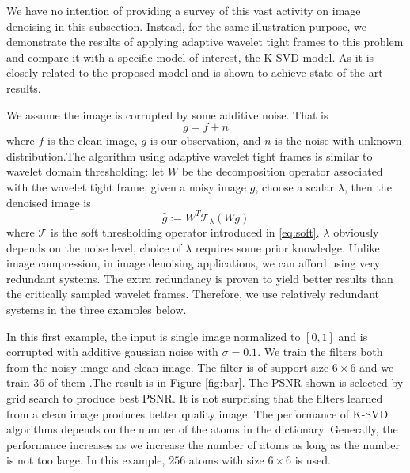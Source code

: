 \documentclass[a4paper]{article}
\begin{document}
We have no intention of providing a survey of this vast activity on image denoising in this subsection. Instead, for the same illustration purpose, we demonstrate the results of applying adaptive wavelet tight frames to this problem and compare it with a specific model of interest, the K-SVD model\cite{elad2006image}. As it is closely related to the proposed model and is shown to achieve state of the art results.

We assume the image is corrupted by some additive noise. That is 
\[
g=f+n
\]
where $f$ is the clean image, $g$ is our observation, and $n$ is the noise with unknown distribution.The algorithm using adaptive wavelet tight frames is similar to wavelet domain thresholding: let $W$ be the decomposition operator associated with the wavelet tight frame, given a noisy image $g$, choose a scalar $\lambda$, then the denoised image is
\[
\hat{g} :=W^T \mathcal{T}_{\lambda} (Wg)
\]
where $\mathcal{T}$ is the soft thresholding operator introduced in \eqref{eq:soft}. $\lambda$ obviously depends on the noise level, choice of $\lambda$ requires some prior knowledge. Unlike image compression, in image denoising applications, we can afford using very redundant systems. The extra redundancy is proven to yield better results than the critically sampled wavelet frames. Therefore, we use relatively redundant systems in the three examples below.

In this first example, the input is single image normalized to $[0,1]$ and is corrupted with additive gaussian noise with $\sigma=0.1$. We train the filters both from the noisy image and clean image. The filter is of support size $6\times 6$ and we train $36$ of them .The result is in Figure \ref{fig:bar}.  The PSNR shown is selected by grid search to produce best PSNR. It is not surprising that the filters learned from a clean image produces better quality image. The performance of K-SVD algorithms depends on the number of the atoms in the dictionary. Generally, the performance increases as we increase the number of atoms as long as the number is not too large. In this example, $256$ atoms with size $6\times 6$ is used.
\end{document}
